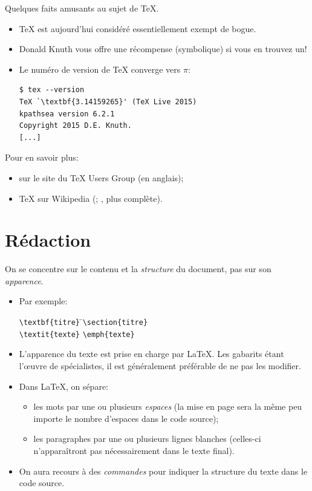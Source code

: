 \begin{information}
  Quelques faits amusants au sujet de {\TeX}.
  \begin{itemize}
  \item {\TeX} est aujourd'hui considéré essentiellement exempt de
    bogue.
  \item Donald Knuth vous offre une récompense (symbolique) si vous en
    trouvez un!
  \item Le numéro de version de {\TeX} converge vers $\pi$:
\begin{lstlisting}
$ tex --version
TeX `\textbf{3.14159265}' (TeX Live 2015)
kpathsea version 6.2.1
Copyright 2015 D.E. Knuth.
[...]
\end{lstlisting}
  \end{itemize}
  Pour en savoir plus:
  \begin{itemize}
  \item {} sur le
    site du {\TeX} Users Group (en anglais);
  \item {\TeX} sur Wikipedia
    (;
    , plus
    complète).
  \end{itemize}
\end{information}

\section{Rédaction}

On se concentre sur le contenu et la \emph{structure} du document,
pas sur son \emph{apparence}.

\begin{itemize}
\item Par exemple: \bigskip
  \begin{tabbing}
    \verb=\textbf{titre}= \qquad\= \faArrowRight \qquad\= \verb|\section{titre}| \\[6pt]
    \verb|\textit{texte}| \> \faArrowRight \> \verb|\emph{texte}|
  \end{tabbing}
  \bigskip
\item L'apparence du texte est prise en charge par {\LaTeX}. Les
  gabarits étant l'{\oe}uvre de spécialistes, il est généralement
  préférable de ne pas les modifier.
\item Dans {\LaTeX}, on sépare:
  \begin{itemize}
  \item les mots par une ou plusieurs \emph{espaces} (la mise en page
    sera la même peu importe le nombre d'espaces dans le code source);
  \item les paragraphes par une ou plusieurs lignes blanches
    (celles-ci n'apparaîtront pas nécessairement dans le texte final).
  \end{itemize}
\item On aura recours à des \emph{commandes} pour indiquer la
  structure du texte dans le code source.
\end{itemize}


